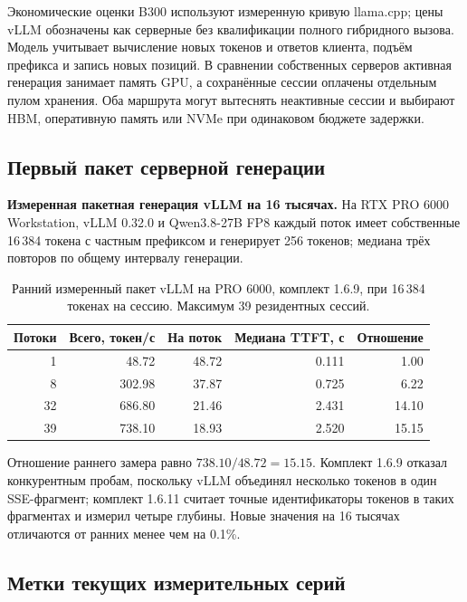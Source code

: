 Экономические оценки B300 используют измеренную кривую llama.cpp; цены vLLM обозначены как серверные без квалификации полного гибридного вызова.
Модель учитывает вычисление новых токенов и ответов клиента, подъём префикса и запись новых позиций.
В сравнении собственных серверов активная генерация занимает память GPU, а сохранённые сессии
оплачены отдельным пулом хранения. Оба маршрута могут вытеснять неактивные сессии
и выбирают HBM, оперативную память или NVMe при одинаковом бюджете задержки.

\subsection{Первый пакет серверной генерации}
\label{app:server-first-batch}

\textbf{Измеренная пакетная генерация vLLM на 16 тысячах.} На RTX PRO 6000 Workstation,
vLLM 0.32.0 и Qwen3.8-27B FP8 каждый поток имеет собственные 16\,384 токена с частным префиксом
и генерирует 256 токенов; медиана трёх повторов по общему интервалу генерации.

\begin{table}[t]
\centering
\caption{Ранний измеренный пакет vLLM на PRO 6000, комплект 1.6.9, при 16\,384 токенах на сессию. Максимум 39 резидентных сессий.}
\label{tab:vllm-decode16}
\begin{tabular}{rrrrr}
\toprule
Потоки & Всего, токен/с & На поток & Медиана TTFT, с & Отношение \\
\midrule
1 & 48.72 & 48.72 & 0.111 & 1.00 \\
8 & 302.98 & 37.87 & 0.725 & 6.22 \\
32 & 686.80 & 21.46 & 2.431 & 14.10 \\
39 & 738.10 & 18.93 & 2.520 & 15.15 \\
\bottomrule
\end{tabular}
\end{table}

Отношение раннего замера равно $738.10/48.72=15.15$. Комплект 1.6.9 отказал конкурентным пробам,
поскольку vLLM объединял несколько токенов в один SSE-фрагмент; комплект 1.6.11 считает точные идентификаторы токенов
в таких фрагментах и измерил четыре глубины. Новые значения на 16 тысячах отличаются от ранних менее чем на 0.1\%.

\subsection{Метки текущих измерительных серий}
\label{app:current-method-labels}

